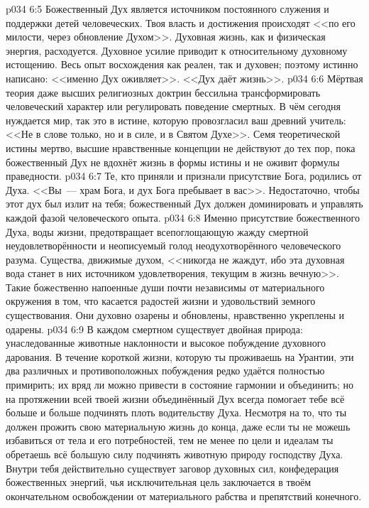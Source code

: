 \vs p034 6:5 \pc Божественный Дух является источником постоянного служения и поддержки детей человеческих. Твоя власть и достижения происходят <<по его милости, через обновление Духом>>. Духовная жизнь, как и физическая энергия, расходуется. Духовное усилие приводит к относительному духовному истощению. Весь опыт восхождения как реален, так и духовен; поэтому истинно написано: <<именно Дух оживляет>>. <<Дух даёт жизнь>>.
\vs p034 6:6 Мёртвая теория даже высших религиозных доктрин бессильна трансформировать человеческий характер или регулировать поведение смертных. В чём сегодня нуждается мир, так это в истине, которую провозгласил ваш древний учитель: <<Не в слове только, но и в силе, и в Святом Духе>>. Семя теоретической истины мертво, высшие нравственные концепции не действуют до тех пор, пока божественный Дух не вдохнёт жизнь в формы истины и не оживит формулы праведности.
\vs p034 6:7 Те, кто приняли и признали присутствие Бога, родились от Духа. <<Вы~--- храм Бога, и дух Бога пребывает в вас>>. Недостаточно, чтобы этот дух был излит на тебя; божественный Дух должен доминировать и управлять каждой фазой человеческого опыта.
\vs p034 6:8 Именно присутствие божественного Духа, воды жизни, предотвращает всепоглощающую жажду смертной неудовлетворённости и неописуемый голод неодухотворённого человеческого разума. Существа, движимые духом, <<никогда не жаждут, ибо эта духовная вода станет в них источником удовлетворения, текущим в жизнь вечную>>. Такие божественно напоенные души почти независимы от материального окружения в том, что касается радостей жизни и удовольствий земного существования. Они духовно озарены и обновлены, нравственно укреплены и одарены.
\vs p034 6:9 \pc В каждом смертном существует двойная природа: унаследованные животные наклонности и высокое побуждение духовного дарования. В течение короткой жизни, которую ты проживаешь на Урантии, эти два различных и противоположных побуждения редко удаётся полностью примирить; их вряд ли можно привести в состояние гармонии и объединить; но на протяжении всей твоей жизни объединённый Дух всегда помогает тебе всё больше и больше подчинять плоть водительству Духа. Несмотря на то, что ты должен прожить свою материальную жизнь до конца, даже если ты не можешь избавиться от тела и его потребностей, тем не менее по цели и идеалам ты обретаешь всё большую силу подчинять животную природу господству Духа. Внутри тебя действительно существует заговор духовных сил, конфедерация божественных энергий, чья исключительная цель заключается в твоём окончательном освобождении от материального рабства и препятствий конечного.
